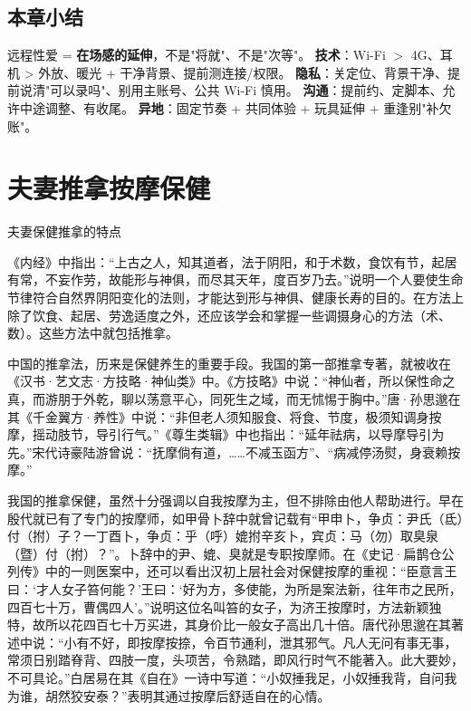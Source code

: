 \documentclass[12pt,UTF8,openany]{ctexbook}
\begin{document}
\section{本章小结}
远程性爱 = \textbf{在场感的延伸}，不是"将就"、不是"次等"。
\textbf{技术}：Wi-Fi $>$ 4G、耳机 > 外放、暖光 + 干净背景、提前测连接/权限。
\textbf{隐私}：关定位、背景干净、提前说清"可以录吗"、别用主账号、公共 Wi-Fi 慎用。
\textbf{沟通}：提前约、定脚本、允许中途调整、有收尾。
\textbf{异地}：固定节奏 + 共同体验 + 玩具延伸 + 重逢别"补欠账"。




\clearpage
\chapter{夫妻推拿按摩保健}


夫妻保健推拿的特点


《内经》中指出：“上古之人，知其道者，法于阴阳，和于术数，食饮有节，起居有常，不妄作劳，故能形与神俱，而尽其天年，度百岁乃去。”说明一个人要使生命节律符合自然界阴阳变化的法则，才能达到形与神俱、健康长寿的目的。在方法上除了饮食、起居、劳逸适度之外，还应该学会和掌握一些调摄身心的方法（术、数）。这些方法中就包括推拿。

中国的推拿法，历来是保健养生的重要手段。我国的第一部推拿专著，就被收在《汉书·艺文志·方技略·神仙类》中。《方技略》中说：“神仙者，所以保性命之真，而游朋于外乾，聊以荡意平心，同死生之域，而无怵惕于胸中。”唐·孙思邈在其《千金翼方·养性》中说：“非但老人须知服食、将食、节度，极须知调身按摩，摇动肢节，导引行气。”《尊生类辑》中也指出：“延年祛病，以导摩导引为先。”宋代诗豪陆游曾说：“抚摩倘有道，……不减玉函方”、“病减停汤熨，身衰赖按摩。”

我国的推拿保健，虽然十分强调以自我按摩为主，但不排除由他人帮助进行。早在殷代就已有了专门的按摩师，如甲骨卜辞中就曾记载有“甲申卜，争贞：尹氏（氐）付（拊）子？一丁酉卜，争贞：乎（呼）媲拊辛亥卜，宾贞：马（勿）取臭泉（暨）付（拊）？”。卜辞中的尹、媲、臭就是专职按摩师。在《史记·扁鹊仓公列传》中的一则医案中，还可以看出汉初上层社会对保健按摩的重视：“臣意言王曰：‘才人女子笞何能？’王曰：‘好为方，多使能，为所是案法新，往年市之民所，四百七十万，曹偶四人’。”说明这位名叫笞的女子，为济王按摩时，方法新颖独特，故所以花四百七十万买进，其身价比一般女子高出几十倍。唐代孙思邈在其著述中说：“小有不好，即按摩按捺，令百节通利，泄其邪气。凡人无问有事无事，常须日别踏脊背、四肢一度，头项苦，令熟踏，即风行时气不能著入。此大要妙，不可具论。”白居易在其《自在》一诗中写道：“小奴捶我足，小奴捶我背，自问我为谁，胡然狡安泰？”表明其通过按摩后舒适自在的心情。
\end{document}
